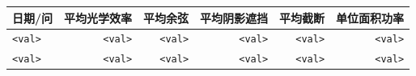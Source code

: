 \begin{tabular}{lrrrrr}
\toprule
\textbf{日期/问} & \textbf{平均光学效率} & \textbf{平均余弦} & \textbf{平均阴影遮挡} & \textbf{平均截断} & \textbf{单位面积功率} \\\midrule
\texttt{<val>} & \texttt{<val>} & \texttt{<val>} & \texttt{<val>} & \texttt{<val>} & \texttt{<val>} \\
\texttt{<val>} & \texttt{<val>} & \texttt{<val>} & \texttt{<val>} & \texttt{<val>} & \texttt{<val>} \\\bottomrule
\end{tabular}
